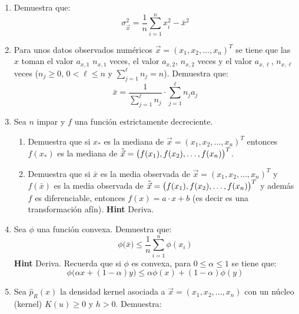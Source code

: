 \documentclass[
]{book}
\providecommand{\tightlist}{%
  \setlength{\itemsep}{0pt}\setlength{\parskip}{0pt}}
\begin{document}
\begin{enumerate}
\def\labelenumi{\arabic{enumi}.}
\setcounter{enumi}{1}
\item
  Demuestra que:
  \[
  \sigma^2_{\vec{x}} = \dfrac{1}{n}\sum\limits_{i=1}^n x_i^2 - \bar{x}^2
  \]
\item
  Para unos datos observados numéricos \(\vec{x} = (x_1, x_2, \dots, x_n)^T\) se tiene que las \(x\) toman el valor \(a_{x,1}\) \(n_{x,1}\) veces, el valor \(a_{x,2}\), \(n_{x,2}\) veces y el valor \(a_{x,\ell}\), \(n_{x,\ell}\) veces (\(n_j \geq 0\), \(0 < \ell \leq n\) y \(\sum_{j=1}^{\ell} n_j = n\)). Demuestra que:
  \[
   \bar{x} = \dfrac{1}{\sum_{j = 1}^{\ell} n_{j}} \cdot \sum\limits_{j=1}^{\ell} n_j a_j 
  \]
\item
  Sea \(n\) impar y \(f\) una función estrictamente decreciente.

  \begin{enumerate}
  \def\labelenumii{\alph{enumii}.}
  \tightlist
  \item
    Demuestra que si \(x_*\) es la mediana de \(\vec{x} = ( x_1, x_2,\dots, x_n)^T\) entonces \(f(x_*)\) es la mediana de \(\Tilde{\vec{x}} = \big( f(x_1), f(x_2),\dots, f(x_n)\big)^T\).
  \item
    Demuestra que si \(\bar{x}\) es la media observada de \(\vec{x} = ( x_1, x_2,\dots, x_n)^T\) y \(f(\bar{x})\) es la media observada de \(\Tilde{\vec{x}} = \big( f(x_1), f(x_2),\dots, f(x_n)\big)^T\) y además \(f\) es diferenciable, entonces \(f(x) = a \cdot x + b\) (es decir es una transformación afín). \textbf{Hint} Deriva.
  \end{enumerate}
\item
  Sea \(\phi\) una función convexa. Demuestra que:
  \[
   \phi \Big( \bar{x} \Big) \leq \dfrac{1}{n}\sum\limits_{i=1}^n \phi(x_i)
  \]
  \textbf{Hint} Deriva. Recuerda que si \(\phi\) es convexa, para \(0 \leq \alpha \leq 1\) se tiene que:
  \[
  \phi\big(\alpha x + (1-\alpha) y\big) \leq \alpha \phi(x) + (1-\alpha)\phi(y)
  \]
\item
  Sea \(\hat{p}_R(x)\) la densidad kernel asociada a \(\vec{x} = (x_1, x_2, \dots, x_n)\) con un núcleo (kernel) \(K(u) \geq 0\) y \(h > 0\). Demuestra:


\end{enumerate}
\end{document}
